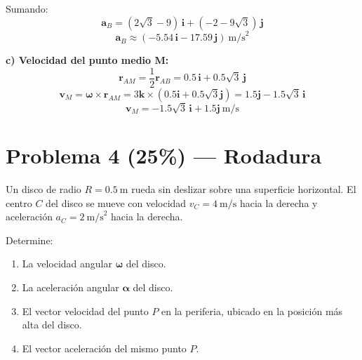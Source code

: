 \documentclass[12pt,a4paper]{article}
\begin{document}
\begin{solbox}
Sumando:
\[
\mathbf{a}_B = (2\sqrt{3} - 9)\,\mathbf{i} + (-2 - 9\sqrt{3})\,\mathbf{j}
\]
\[
\boxed{\mathbf{a}_B \approx (-5.54\,\mathbf{i} - 17.59\,\mathbf{j})\ \text{m/s}^2}
\]

\textbf{c) Velocidad del punto medio M:}
\[
\mathbf{r}_{AM} = \frac{1}{2}\mathbf{r}_{AB} = 0.5\,\mathbf{i} + 0.5\sqrt{3}\,\mathbf{j}
\]
\[
\mathbf{v}_M = \boldsymbol{\omega} \times \mathbf{r}_{AM}
= 3\mathbf{k} \times (0.5\mathbf{i} + 0.5\sqrt{3}\mathbf{j})
= 1.5\mathbf{j} - 1.5\sqrt{3}\,\mathbf{i}
\]
\[
\boxed{\mathbf{v}_M = -1.5\sqrt{3}\,\mathbf{i} + 1.5\mathbf{j}\ \text{m/s}}
\]
\end{solbox}

\newpage

\section*{Problema 4 (25\%) --- Rodadura}

Un disco de radio $R = 0.5\ \text{m}$ rueda sin deslizar sobre una superficie
horizontal. El centro $C$ del disco se mueve con velocidad $v_C = 4\ \text{m/s}$
hacia la derecha y aceleración $a_C = 2\ \text{m/s}^2$ hacia la derecha.

Determine:

\begin{enumerate}[label=\alph*)]
    \item La velocidad angular $\boldsymbol{\omega}$ del disco.
    \item La aceleración angular $\boldsymbol{\alpha}$ del disco.
    \item El vector velocidad del punto $P$ en la periferia, ubicado en la
          posición más alta del disco.
    \item El vector aceleración del mismo punto $P$.
\end{enumerate}

\vspace{0.5cm}
\end{document}
